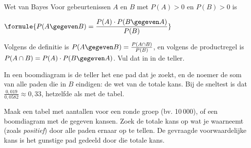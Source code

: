 \begin{theorie}
\begin{stelling}{Wet van Bayes}
Voor gebeurtenissen $A$ en $B$ met $P(A) > 0$ en $P(B) > 0$ is

\vspace{1mm}
\qquad $\formule{P(A \gegeven B) = \dfrac{P(A) \cdot P(B \gegeven A)}{P(B)}}$
\end{stelling}

\begin{bewijs}
Volgens de definitie is $P(A \gegeven B) = \frac{P(A \cap B)}{P(B)}$, en volgens de productregel is $P(A \cap B) = P(A) \cdot P(B \gegeven A)$. Vul dat in in de teller.
\end{bewijs}
\end{theorie}

In een boomdiagram is de teller het ene pad dat je zoekt, en de noemer de som van alle paden die in $B$ eindigen: de wet van de totale kans. Bij de sneltest is dat $\frac{0{,}019}{0{,}0582} \approx 0{,}33$, hetzelfde als met de tabel.


\begin{werkwijze}
Maak een tabel met aantallen voor een ronde groep (bv. 10\,000), of een boomdiagram met de gegeven kansen. Zoek de totale kans op wat je waarneemt (zoals \textit{positief}) door alle paden ernaar op te tellen. De gevraagde voorwaardelijke kans is het gunstige pad gedeeld door die totale kans.
\end{werkwijze}

\begin{oefeningen}

\end{oefeningen}

